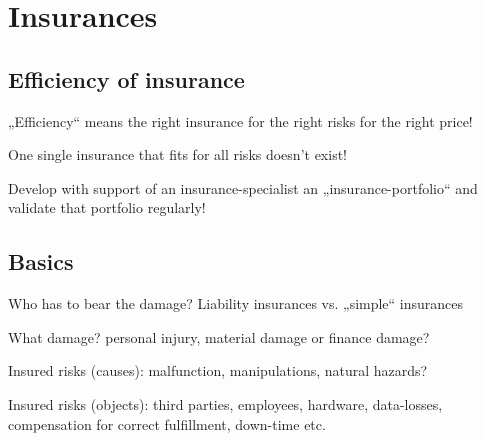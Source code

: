\section{Insurances}
\subsection{Efficiency of insurance}
\begin{compactitem}
	\item „Efficiency“ means the right insurance for the right risks for the right price!
	\item One single insurance that fits for all risks doesn’t exist!
	\item Develop with support of an insurance-specialist an „insurance-portfolio“ and validate that portfolio regularly!
\end{compactitem}

\subsection{Basics}
\begin{compactitem}
	\item Who has to bear the damage? Liability insurances vs. „simple“	insurances
	\item What damage? personal injury, material damage or finance damage?
	\item Insured risks (causes): malfunction, manipulations, natural hazards?
	\item Insured risks (objects): third parties, employees, hardware, data-losses, compensation for correct fulfillment, down-time etc.
\end{compactitem}

